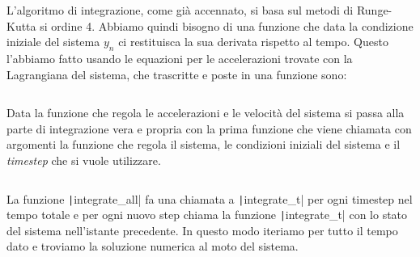 \documentclass[12pt]{article}
\begin{document}
L'algoritmo di integrazione, come già accennato, si basa sul metodi di Runge-Kutta si ordine 4. Abbiamo quindi bisogno di una funzione che data la condizione iniziale del sistema \(y_n\) ci restituisca la sua derivata rispetto al tempo. Questo l'abbiamo fatto usando le equazioni per le accelerazioni trovate con la Lagrangiana del sistema, che trascritte e poste in una funzione sono:

\begingroup
\obeylines
\inputminted[fontsize=\scriptsize, linenos, breaklines=true, xleftmargin=0.75cm, frame=lines, tabsize=2]{cython}{code/Cython/dSdt.pyx}
\endgroup

Data la funzione che regola le accelerazioni e le velocità del sistema si passa alla parte di integrazione vera e propria con la prima funzione che viene chiamata con argomenti la funzione che regola il sistema, le condizioni iniziali del sistema e il \textit{timestep} che si vuole utilizzare.

\begingroup
\obeylines
\inputminted[fontsize=\scriptsize, linenos, breaklines=true, xleftmargin=0.75cm, frame=lines, tabsize=2]{cython}{code/Cython/integrate_all.pyx}
\endgroup

La funzione \texttt|integrate_all| fa una chiamata a \texttt|integrate_t| per ogni timestep nel tempo totale e per ogni nuovo step chiama la funzione \texttt|integrate_t| con lo stato del sistema nell'istante precedente. In questo modo iteriamo per tutto il tempo dato e troviamo la soluzione numerica al moto del sistema.

\begingroup
\obeylines
\inputminted[fontsize=\scriptsize, linenos, breaklines=true, xleftmargin=0.75cm, frame=lines]{cython}{code/Cython/integrate_t.pyx}
\endgroup



\newpage
\end{document}
